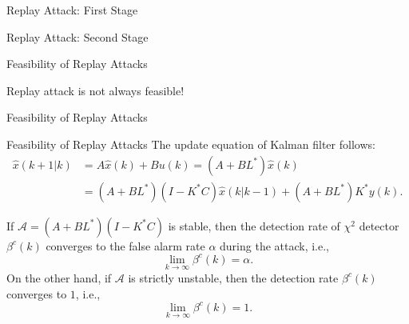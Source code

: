 \documentclass[10pt]{beamer}
\newlength\figureheight
\newlength\figurewidth
\newcommand{\tikzdir}[1]{#1.tikz}
\newcommand{\inputtikz}[1]{}}
\begin{document}
  \begin{frame}{Replay Attack: First Stage}
    \begin{figure}[htpb]
      \begin{center}
	\inputtikz{replaydiagramone}
      \end{center}
    \end{figure}
  \end{frame}

  \begin{frame}{Replay Attack: Second Stage}
    \begin{figure}[htpb]
      \begin{center}
	\inputtikz{replaydiagramtwo}
      \end{center}
    \end{figure}
  \end{frame}

  \begin{frame}{Feasibility of Replay Attacks}
    \begin{figure}[htpb]
      \setlength\figureheight{4.5cm}
      \setlength\figurewidth{10cm}
      \begin{center}
	\inputtikz{replayunstableA2}
      \end{center}
    \end{figure}
    Replay attack is not always feasible!
  \end{frame}

  \begin{frame}{Feasibility of Replay Attacks}
    \begin{figure}[htpb]
      \begin{center}
	\inputtikz{replaydiagramthree}
      \end{center}
    \end{figure}
  \end{frame}

  \begin{frame}{Feasibility of Replay Attacks}
    The update equation of Kalman filter follows:
    \begin{align*}
      \hat{x}(k+1|k)&=A\hat{x}(k)+Bu(k)=\left(A+BL^*\right)\hat{x}(k)\\
      &=\left(A+BL^*\right)\left(I-K^*C\right)\hat{x}(k|k-1)+\left(A+BL^*\right)K^*y(k).
    \end{align*}

    \begin{theorem}
      If $\mathcal A = (A+BL^*)(I-K^*C)$ is stable, then the detection rate of $\chi^2$ detector $\beta^c(k)$ converges to the false alarm rate $\alpha$ during the attack, i.e.,
      \begin{displaymath}
	\lim_{k\rightarrow\infty}\beta^c(k) = \alpha.  
      \end{displaymath}
      On the other hand, if $\mathcal A$ is strictly unstable, then the detection rate $\beta^c(k)$ converges to $1$, i.e.,
      \begin{displaymath}
	\lim_{k\rightarrow\infty}\beta^c(k) = 1.  
      \end{displaymath}
    \end{theorem}
  \end{frame}
\end{document}
